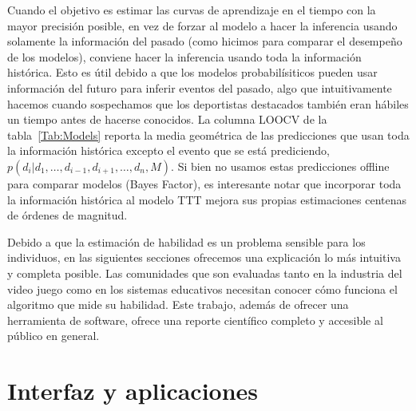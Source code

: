 \documentclass[a4paper,11pt]{book}
\theoremstyle{definition}
\begin{document}
Cuando el objetivo es estimar las curvas de aprendizaje en el tiempo con la mayor precisión posible, en vez de forzar al modelo a hacer la inferencia usando solamente la información del pasado (como hicimos para comparar el desempeño de los modelos), conviene hacer la inferencia usando toda la información histórica.
%
Esto es útil debido a que los modelos probabilísiticos pueden usar información del futuro para inferir eventos del pasado, algo que intuitivamente hacemos cuando sospechamos que los deportistas destacados también eran hábiles un tiempo antes de hacerse conocidos.
%
La columna LOOCV de la tabla~\ref{Tab:Models} reporta la media geométrica de las predicciones que usan toda la información histórica excepto el evento que se está prediciendo, $p(d_i| d_1, \dots, d_{i-1}, d_{i+1}, \dots, d_n , M)$.
%
Si bien no usamos estas predicciones offline para comparar modelos (Bayes Factor), es interesante notar que incorporar toda la información histórica al modelo TTT mejora sus propias estimaciones centenas de órdenes de magnitud.

Debido a que la estimación de habilidad es un problema sensible para los individuos, en las siguientes secciones ofrecemos una explicación lo más intuitiva y completa posible.
%
Las comunidades que son evaluadas tanto en la industria del video juego como en los sistemas educativos necesitan conocer cómo funciona el algoritmo que mide su habilidad.
%
Este trabajo, además de ofrecer una herramienta de software, ofrece una reporte científico completo y accesible al público en general.


\section{Interfaz y aplicaciones} \label{sec:illustrations}
\end{document}
